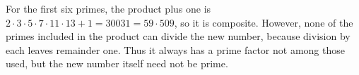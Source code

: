 For the first six primes, the product plus one is $2\cdot3\cdot5\cdot7\cdot11\cdot13+1=30031=59\cdot509$, so it is composite. However, none of the primes included in the product can divide the new number, because division by each leaves remainder one. Thus it always has a prime factor not among those used, but the new number itself need not be prime.
